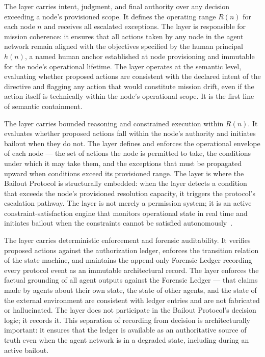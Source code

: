 The \purpose{} layer carries intent, judgment, and final authority over any decision exceeding a node's provisioned scope. It defines the operating range $R(n)$ for each node $n$ and receives all escalated exceptions. The \purpose{} layer is responsible for mission coherence: it ensures that all actions taken by any node in the agent network remain aligned with the objectives specified by the human principal $h(n)$, a named human anchor established at node provisioning and immutable for the node's operational lifetime. The \purpose{} layer operates at the semantic level, evaluating whether proposed actions are consistent with the declared intent of the directive and flagging any action that would constitute mission drift, even if the action itself is technically within the node's operational scope. It is the first line of semantic containment.

The \bounds{} layer carries bounded reasoning and constrained execution within $R(n)$. It evaluates whether proposed actions fall within the node's authority and initiates bailout when they do not. The \bounds{} layer defines and enforces the operational envelope of each node --- the set of actions the node is permitted to take, the conditions under which it may take them, and the exceptions that must be propagated upward when conditions exceed its provisioned range. The \bounds{} layer is where the Bailout Protocol is structurally embedded: when the \bounds{} layer detects a condition that exceeds the node's provisioned resolution capacity, it triggers the protocol's escalation pathway. The \bounds{} layer is not merely a permission system; it is an active constraint-satisfaction engine that monitors operational state in real time and initiates bailout when the constraints cannot be satisfied autonomously~\cite{dijkstra1982,bansal2019}.

The \fact{} layer carries deterministic enforcement and forensic auditability. It verifies proposed actions against the authorization ledger, enforces the transition relation of the state machine, and maintains the append-only Forensic Ledger recording every protocol event as an immutable architectural record. The \fact{} layer enforces the factual grounding of all agent outputs against the Forensic Ledger --- that claims made by agents about their own state, the state of other agents, and the state of the external environment are consistent with ledger entries and are not fabricated or hallucinated. The \fact{} layer does not participate in the Bailout Protocol's decision logic; it records it. This separation of recording from decision is architecturally important: it ensures that the ledger is available as an authoritative source of truth even when the agent network is in a degraded state, including during an active bailout.

